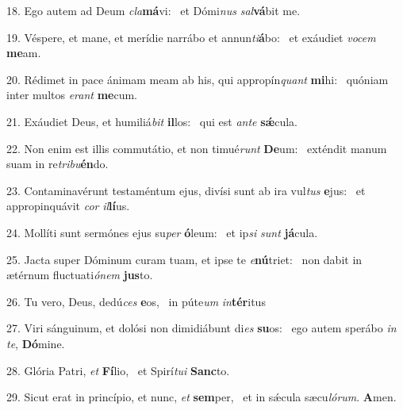 18. Ego autem ad Deum \textit{cla}\textbf{má}vi: \ast\  et Dómi\textit{nus} \textit{sal}\textbf{vá}bit me.\

19. Véspere, et mane, et merídie narrábo et annun\textit{ti}\textbf{á}bo: \ast\  et exáudiet \textit{vo}\textit{cem} \textbf{me}am.\

20. Rédimet in pace ánimam meam ab his, qui appropín\textit{quant} \textbf{mi}hi: \ast\  quóniam inter multos \textit{e}\textit{rant} \textbf{me}cum.\

21. Exáudiet Deus, et humiliá\textit{bit} \textbf{il}los: \ast\  qui est \textit{an}\textit{te} \textbf{sǽ}cula.\

22. Non enim est illis commutátio, et non timué\textit{runt} \textbf{De}um: \ast\  exténdit manum suam in re\textit{tri}\textit{bu}\textbf{én}do.\

23. Contaminavérunt testaméntum ejus, divísi sunt ab ira vul\textit{tus} \textbf{e}jus: \ast\  et appropinquávit \textit{cor} \textit{il}\textbf{lí}us.\

24. Mollíti sunt sermónes ejus su\textit{per} \textbf{ó}leum: \ast\  et ip\textit{si} \textit{sunt} \textbf{já}cula.\

25. Jacta super Dóminum curam tuam, et ipse te \textit{e}\textbf{nú}triet: \ast\  non dabit in ætérnum fluctuati\textit{ó}\textit{nem} \textbf{jus}to.\

26. Tu vero, Deus, dedú\textit{ces} \textbf{e}os, \ast\  in púte\textit{um} \textit{in}\textbf{tér}itus\

27. Viri sánguinum, et dolósi non dimidiábunt di\textit{es} \textbf{su}os: \ast\  ego autem sperábo \textit{in} \textit{te}, \textbf{Dó}mine.\

28. Glória Patri, \textit{et} \textbf{Fí}lio, \ast\  et Spirí\textit{tu}\textit{i} \textbf{Sanc}to.\

29. Sicut erat in princípio, et nunc, \textit{et} \textbf{sem}per, \ast\  et in sǽcula sæcu\textit{ló}\textit{rum}. \textbf{A}men.\

